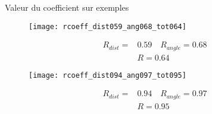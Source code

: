 \begin{frame}{Valeur du coefficient sur exemples}
    \begin{multicols}{2}
        \begin{figure}
            \centering
            \texttt{[image: rcoeff\_dist059\_ang068\_tot064]}
        \end{figure}
    \vspace*{0.2cm}
        \begin{align*}
            R_{dist} = &0.59 \quad R_{angle} = 0.68 \\
            &\boxed{R = 0.64}
        \end{align*}
    \end{multicols}
    \begin{multicols}{2}
        \begin{figure}
            \centering
            \texttt{[image: rcoeff\_dist094\_ang097\_tot095]}
        \end{figure}
    \vspace*{0.2cm}
            \begin{align*}
                R_{dist} = &0.94 \quad R_{angle} = 0.97 \\
                &\boxed{R = 0.95}
            \end{align*}
    \end{multicols}
\end{frame}